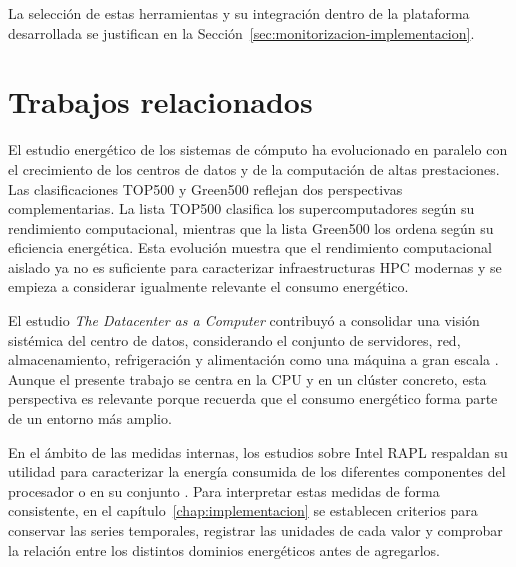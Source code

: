 La selección de estas herramientas y su integración dentro de la plataforma desarrollada se justifican en la Sección~\ref{sec:monitorizacion-implementacion}.

\section{Trabajos relacionados}

El estudio energético de los sistemas de cómputo ha evolucionado en paralelo con el crecimiento de los centros de datos y de la computación de altas prestaciones. Las clasificaciones TOP500 y Green500 reflejan dos perspectivas complementarias. La lista TOP500 clasifica los supercomputadores según su rendimiento computacional, mientras que la lista Green500 los ordena según su eficiencia energética. Esta evolución muestra que el rendimiento computacional aislado ya no es suficiente para caracterizar infraestructuras HPC modernas y se empieza a considerar igualmente relevante el consumo energético.

El estudio \emph{The Datacenter as a Computer} contribuyó a consolidar una visión sistémica del centro de datos, considerando el conjunto de servidores, red, almacenamiento, refrigeración y alimentación como una máquina a gran escala \parencite{barroso2018datacenter}. Aunque el presente trabajo se centra en la CPU y en un clúster concreto, esta perspectiva es relevante porque recuerda que el consumo energético forma parte de un entorno más amplio.

En el ámbito de las medidas internas, los estudios sobre Intel RAPL respaldan su utilidad para caracterizar la energía consumida de los diferentes componentes del procesador o en su conjunto \parencite{khan2018Rapl}. Para interpretar estas medidas de forma consistente, en el capítulo~\ref{chap:implementacion} se establecen criterios para conservar las series temporales, registrar las unidades de cada valor y comprobar la relación entre los distintos dominios energéticos antes de agregarlos.